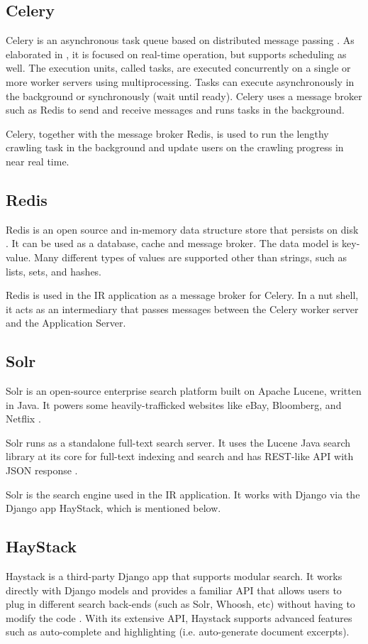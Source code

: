 \subsection{Celery}
Celery is an asynchronous task queue based on distributed message passing \cite{Celery}. As elaborated in \cite{Celery}, it is focused on real-time operation, but supports scheduling as well. The execution units, called tasks, are executed concurrently on a single or more worker servers using multiprocessing. Tasks can execute asynchronously in the background or synchronously (wait until ready). Celery uses a message broker such as Redis to send and receive messages and runs tasks in the background.

Celery, together with the message broker Redis, is used to run the lengthy crawling task in the background and update users on the crawling progress in near real time. 

\subsection{Redis}
Redis is an open source and in-memory data structure store that persists on disk \cite{Redis}. It can be used as a database, cache and message broker. The data model is key-value. Many different types of values are supported other than strings, such as lists, sets, and hashes.

Redis is used in the IR application as a message broker for Celery. In a nut shell, it acts as an intermediary that passes messages between the Celery worker server and the Application Server.

\subsection{Solr}
Solr is an open-source enterprise search platform built on Apache Lucene, written in Java. It powers some heavily-trafficked websites like eBay, Bloomberg, and Netflix \cite{Solr}. 

Solr runs as a standalone full-text search server. It uses the Lucene Java search library at its core for full-text indexing and search and has REST-like API with JSON response \cite{Solr}. 

Solr is the search engine used in the IR application. It works with Django via the Django app HayStack, which is mentioned below.

\subsection{HayStack}
Haystack is a third-party Django app that supports modular search. It works directly with Django models \cite{DjangoModels} and provides a familiar API that allows users to plug in different search back-ends (such as Solr, Whoosh, etc) without having to modify the code \cite{Haystack}. With its extensive API, Haystack supports advanced features such as auto-complete and highlighting (i.e. auto-generate document excerpts).

